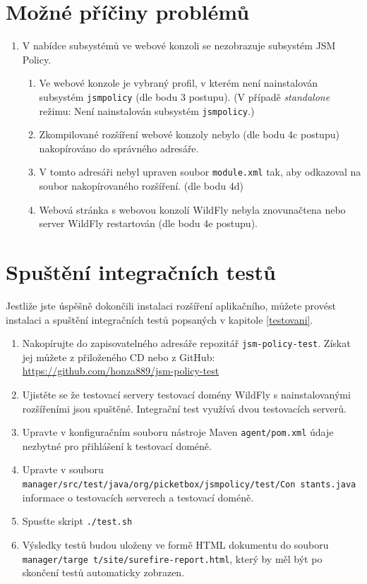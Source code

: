 \begin{enumerate}
\end{enumerate}


\section{Možné příčiny problémů}
\begin{enumerate}
    \item V nabídce subsystémů ve webové konzoli se nezobrazuje subsystém JSM Policy.
    \begin{enumerate}
        \item Ve webové konzole je vybraný profil, v kterém není nainstalován subsystém {\tt jsmpolicy} (dle bodu 3 postupu). (V případě {\it standalone} režimu: Není nainstalován subsystém {\tt jsmpolicy}.)
        \item Zkompilované rozšíření webové konzoly nebylo (dle bodu 4c postupu) nakopírováno do správného adresáře.
        \item V tomto adresáři nebyl upraven soubor {\tt module.xml} tak, aby odkazoval na soubor nakopírovaného rozšíření. (dle bodu 4d)
        \item Webová stránka s webovou konzolí WildFly nebyla znovunačtena nebo server WildFly restartován (dle bodu 4e postupu).
    \end{enumerate}
\end{enumerate}


\section{Spuštění integračních testů}

Jestliže jste úspěšně dokončili instalaci rozšíření aplikačního, můžete provést instalaci a spuštění integračních testů popsaných v kapitole \ref{testovani}.

\begin{enumerate}
  \item Nakopírujte do zapisovatelného adresáře repozitář {\tt jsm-policy-test}. Získat jej můžete z přiloženého CD nebo z GitHub:
    \newline\url{https://github.com/honza889/jsm-policy-test}
  \item Ujistěte se že testovací servery testovací domény WildFly s nainstalovanými rozšířeními jsou spuštěné. Integrační test využívá dvou testovacích serverů.
  \item Upravte v konfiguračním souboru nástroje Maven {\tt agent/pom.xml} údaje nezbytné pro přihlášení k testovací doméně.
  \item Upravte v souboru {\tt manager/src/test/java/org/picketbox/jsmpolicy/test/Con stants.java} informace o testovacích serverech a testovací doméně.
  \item Spusťte skript {\tt ./test.sh}
  \item Výsledky testů budou uloženy ve formě HTML dokumentu do souboru {\tt manager/targe t/site/surefire-report.html}, který by měl být po skončení testů automaticky zobrazen.
\end{enumerate}


